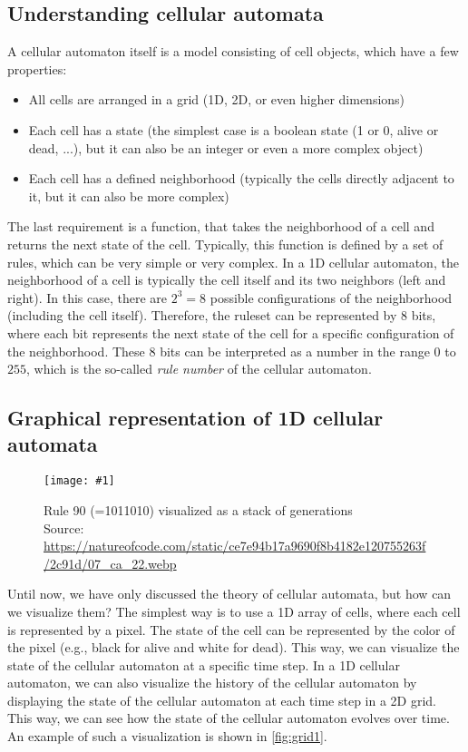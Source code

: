 \documentclass[a4paper,12pt]{llncs}
\numberwithin{equation}{section}
\newcommand{\imagewithwidth}[5]{
  \begin{figure}[htbp]%
    \begin{center}%
      \texttt{[image: \#1]}%
      \caption[#5]{#4}%
      \label{#3}%
    \end{center}%
  \end{figure}
}
\begin{document}
\subsection{Understanding cellular automata}
A cellular automaton itself is a model consisting of cell objects, which have a few properties:
\begin{itemize}
  \item All cells are arranged in a grid (1D, 2D, or even higher dimensions)
  \item Each cell has a state (the simplest case is a boolean state (1 or 0, alive or dead, ...), but it can also be an integer or even a more complex object)
  \item Each cell has a defined neighborhood (typically the cells directly adjacent to it, but it can also be more complex)
\end{itemize}
The last requirement is a function, that takes the neighborhood of a cell and returns the next state of the cell.
Typically, this function is defined by a set of rules, which can be very simple or very complex.
In a 1D cellular automaton, the neighborhood of a cell is typically the cell itself and its two neighbors (left and right).
In this case, there are $2^3=8$ possible configurations of the neighborhood (including the cell itself).
Therefore, the ruleset can be represented by 8 bits, where each bit represents the next state of the cell for a specific configuration of the neighborhood.
These 8 bits can be interpreted as a number in the range $0$ to $255$, which is the so-called \textit{rule number} of the cellular automaton.
\subsection{Graphical representation of 1D cellular automata}
\imagewithwidth{figures/rule90}{\textwidth}{fig:grid1}{Rule 90 (=1011010) visualized as a stack of generations\\Source: \url{https://natureofcode.com/static/ce7e94b17a9690f8b4182e120755263f/2c91d/07_ca_22.webp}}{}
Until now, we have only discussed the theory of cellular automata, but how can we visualize them?
The simplest way is to use a 1D array of cells, where each cell is represented by a pixel.
The state of the cell can be represented by the color of the pixel (e.g., black for alive and white for dead).
This way, we can visualize the state of the cellular automaton at a specific time step.
In a 1D cellular automaton, we can also visualize the history of the cellular automaton by displaying the state of the cellular automaton at each time step in a 2D grid.
This way, we can see how the state of the cellular automaton evolves over time.
An example of such a visualization is shown in \autoref{fig:grid1}.
\end{document}
